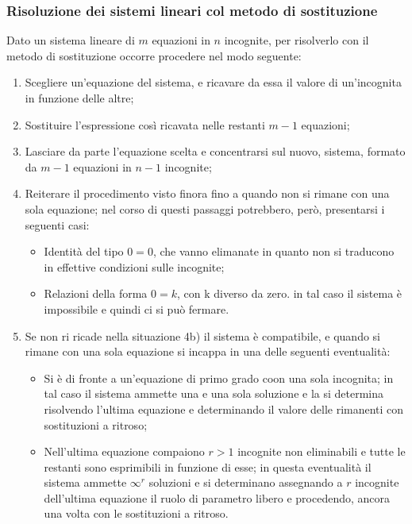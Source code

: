 \documentclass{report}
\begin{document}
\subsubsection{Risoluzione dei sistemi lineari col metodo di sostituzione}

Dato un sistema lineare di $m$ equazioni in $n$ incognite, per risolverlo con il metodo di sostituzione occorre procedere nel modo seguente:

\begin{enumerate}
  \item Scegliere un'equazione del sistema, e ricavare da essa il valore di un'incognita in funzione delle altre;
  \item Sostituire l'espressione così ricavata nelle restanti $m-1$ equazioni;
  \item Lasciare da parte l'equazione scelta e concentrarsi sul nuovo, sistema, formato da $m-1$ equazioni in $n-1$ incognite;
  \item Reiterare il procedimento visto finora fino a quando non si rimane con una sola equazione; nel corso di questi passaggi potrebbero, però, presentarsi i seguenti casi:
    \begin{itemize}
      \item Identità del tipo $0=0$, che vanno elimanate in quanto non si traducono in effettive condizioni sulle incognite;
      \item Relazioni della forma $0=k$, con k diverso da zero. in tal caso il sistema è impossibile e quindi ci si può fermare.
    \end{itemize}
  \item Se non ri ricade nella situazione 4b) il sistema è compatibile, e quando si rimane con una sola equazione si incappa in una delle seguenti eventualità:
    \begin{itemize}
      \item Si è di fronte a un'equazione di primo grado coon una sola incognita; in tal caso il sistema ammette una e una sola soluzione e la si determina risolvendo l'ultima equazione e determinando il valore delle rimanenti con sostituzioni a ritroso;
      \item Nell'ultima equazione compaiono $r>1$ incognite non eliminabili e tutte le restanti sono esprimibili in funzione di esse; in questa eventualità il sistema ammette $\infty^r$ soluzioni e si determinano assegnando a $r$ incognite dell'ultima equazione il ruolo di parametro libero e procedendo, ancora una volta con le sostituzioni a ritroso.

    \end{itemize}
\end{enumerate}
\end{document}
